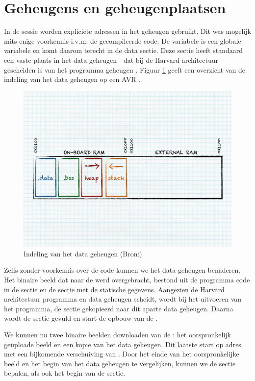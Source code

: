 \section{Geheugens en geheugenplaatsen}

In de  sessie worden expliciete adressen in het geheugen gebruikt. Dit
was mogelijk mits enige voorkennis i.v.m. de gecompileerde code. De
 variabele is een globale variabele en komt daarom terecht in de
 data sectie. Deze sectie heeft standaard een vaste plaats in het
data geheugen - dat bij de Harvard architectuur gescheiden is van het programma
geheugen \citep{avr-memory}. Figuur \ref{fig:avr-ram-map} geeft een overzicht
van de indeling van het data geheugen op een AVR \mcu.

\begin{figure}[ht]
  \centering
  \includegraphics[width=0.9\linewidth]{resources/avr-ram-map.pdf}
  \caption{Indeling van het data geheugen (Bron:\citep{avr-malloc})}
  \label{fig:avr-ram-map}
\end{figure}

Zelfs zonder voorkennis over de code kunnen we het data geheugen benaderen. Het
binaire beeld dat naar de \mcu werd overgebracht, bestond uit de programma code
in de  sectie en de  sectie met de statische gegevens.
Aangezien de Harvard architectuur programma en data geheugen scheidt, wordt bij
het uitvoeren van het programma, de  sectie gekopieerd naar dit
aparte data geheugen. Daarna wordt de  sectie gevuld en start de
opbouw van de .

We kunnen nu twee binaire beelden downloaden van de \mcu: het oorspronkelijk
ge\"uploade beeld en een kopie van het data geheugen. Dit laatste start op
adres  met een bijkomende verschuiving van . Door het
einde van het oorspronkelijke beeld en het begin van het data geheugen te
vergelijken, kunnen we de  sectie bepalen, als ook het begin van de
 sectie.

